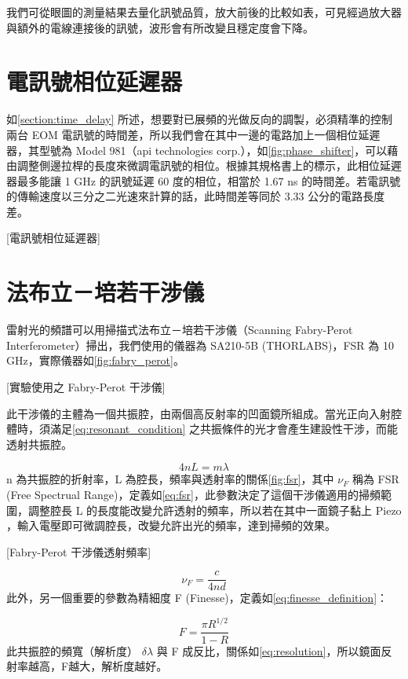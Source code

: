 \documentclass[class=NCU_thesis, crop=false]{standalone}
\begin{document}
我們可從眼圖的測量結果去量化訊號品質，放大前後的比較如表，可見經過放大器與額外的電線連接後的訊號，波形會有所改變且穩定度會下降。

\section{電訊號相位延遲器}
如\cref{section:time_delay} 所述，想要對已展頻的光做反向的調製，必須精準的控制兩台 EOM 電訊號的時間差，所以我們會在其中一邊的電路加上一個相位延遲器，其型號為 Model 981（api technologies corp.），如\cref{fig:phase_shifter}，可以藉由調整側邊拉桿的長度來微調電訊號的相位。根據其規格書上的標示，此相位延遲器最多能讓 1 GHz 的訊號延遲 60 度的相位，相當於 1.67 ns 的時間差。若電訊號的傳輸速度以三分之二光速來計算的話，此時間差等同於 3.33 公分的電路長度差。

[電訊號相位延遲器]


\section{法布立－培若干涉儀}
雷射光的頻譜可以用掃描式法布立－培若干涉儀（Scanning Fabry-Perot Interferometer）掃出，我們使用的儀器為 SA210-5B (THORLABS)，FSR 為 10 GHz，實際儀器如\cref{fig:fabry_perot}。

[實驗使用之 Fabry-Perot 干涉儀]

此干涉儀的主體為一個共振腔，由兩個高反射率的凹面鏡所組成。當光正向入射腔體時，須滿足\cref{eq:resonant_condition} 之共振條件的光才會產生建設性干涉，而能透射共振腔。

\begin{equation}
    4nL=m\lambda
    \label{eq:resonant_condition}
\end{equation}
n 為共振腔的折射率，L 為腔長，頻率與透射率的關係\cref{fig:fsr}，其中 $\nu_{F}$ 稱為 FSR (Free Spectrual Range)，定義如\cref{eq:fsr}，此參數決定了這個干涉儀適用的掃頻範圍，調整腔長 L 的長度能改變允許透射的頻率，所以若在其中一面鏡子黏上 Piezo ，輸入電壓即可微調腔長，改變允許出光的頻率，達到掃頻的效果。

[Fabry-Perot 干涉儀透射頻率]

\begin{equation}
    \nu_{F}=\frac{c}{4nd}
    \label{eq:fsr}
\end{equation}
此外，另一個重要的參數為精細度 F (Finesse)，定義如\cref{eq:finesse_definition}：

\begin{equation}
    F=\frac{\pi R^{1/2}}{1-R}
    \label{eq:finesse_definition}
\end{equation}
此共振腔的頻寬（解析度） $\delta \lambda$ 與 F 成反比，關係如\cref{eq:resolution}，所以鏡面反射率越高，F越大，解析度越好。
\end{document}

